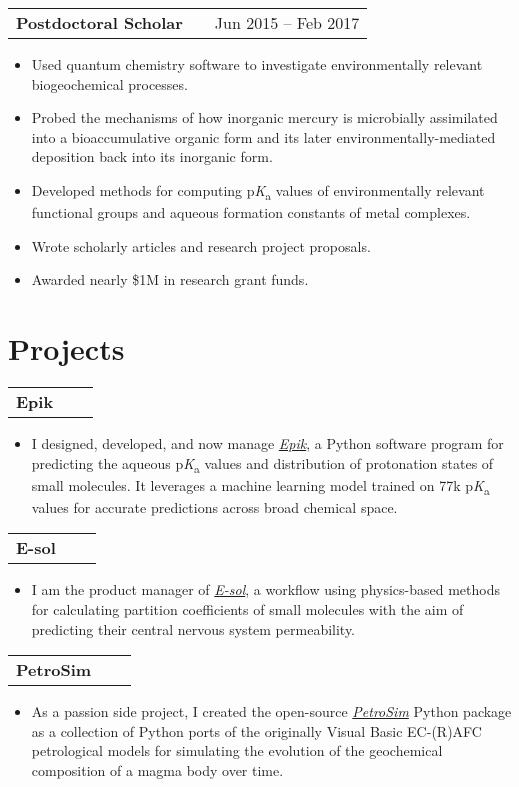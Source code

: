 \documentclass[a4paper,12pt]{article}
\makeatletter
\newenvironment{jobtitle}[2]
    {
    \vspace{4pt}
    \begin{tabularx}{\linewidth}{@{}l X r@{}}
    \textbf{#1} & \hfill &  #2 \\[3.75pt]
    \end{tabularx}
    \begin{minipage}[t]{\linewidth}
    \begin{itemize}[nosep, after=\strut, leftmargin=1em, itemsep=3pt, label=--]
    }
    {
    \end{itemize}
    \vspace{8pt}
    \end{minipage}
    }
\newenvironment{projecttitle}[1]
    {
    \begin{tabularx}{\linewidth}{@{}l X r@{}}
    \textbf{#1} & \hfill \\[3.75pt]
    \end{tabularx}
    }
    {
    }
\newenvironment{projectdescription}[0]
    {
    \vspace{4pt}
    \begin{minipage}[t]{\linewidth}
    \begin{itemize}[nosep, after=\strut, leftmargin=1em, itemsep=3pt, label={}]
    }
    {
    \end{itemize}
    \vspace{-8pt}
    \end{minipage}
    }
\makeatother
\begin{document}
\begin{jobtitle}{Postdoctoral Scholar}{Jun 2015 -- Feb 2017}
    \item Used quantum chemistry software to investigate environmentally relevant biogeochemical processes.
    \item Probed the mechanisms of how inorganic mercury is microbially assimilated into a bioaccumulative organic form and its later environmentally-mediated deposition back into its inorganic form.
    \item Developed methods for computing p\textit{K}\textsubscript{a} values of environmentally relevant functional groups and aqueous formation constants of metal complexes.
    \item Wrote scholarly articles and research project proposals.
    \item Awarded nearly \$1M in research grant funds.
\end{jobtitle}
  
\section{Projects}

\begin{projecttitle}{Epik}
\end{projecttitle}
\begin{projectdescription}
\item I designed, developed, and now manage \href{https://www.schrodinger.com/platform/products/epik/}{\textit{Epik}}, a Python software program for predicting the aqueous p\textit{K}\textsubscript{a} values and distribution of protonation states of small molecules. It leverages a machine learning model trained on 77k p\textit{K}\textsubscript{a} values for accurate predictions across broad chemical space.  \\
\end{projectdescription}
\begin{projecttitle}{E-sol}
\end{projecttitle}
\begin{projectdescription}
\item I am the product manager of \href{https://pubs.acs.org/doi/abs/10.1021/acs.jcim.3c00150}{\textit{E-sol}}, a workflow using physics-based methods for calculating partition coefficients of small molecules with the aim of predicting their central nervous system permeability.  \\
\end{projectdescription}
\begin{projecttitle}{PetroSim}
\end{projecttitle}
\begin{projectdescription}
\item As a passion side project, I created the open-source \href{https://github.com/rynecjohnston/petrosim}{\textit{PetroSim}} Python package as a collection of Python ports of the originally Visual Basic EC-(R)AFC petrological models for simulating the evolution of the geochemical composition of a magma body over time.  \\
\end{projectdescription}
\end{document}
